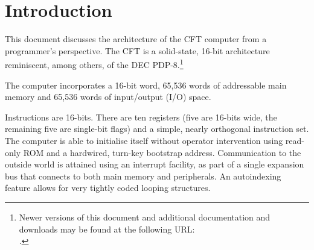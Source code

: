 








\section{Introduction}

  This document discusses the architecture of the CFT computer from a
  programmer's perspective. The CFT is a solid-state, 16-bit
  architecture reminiscent, among others, of the DEC
  PDP-8.\footnote{Newer versions of this document and additional
    documentation and downloads may be found at the following URL:\\
    .}

  The computer incorporates a 16-bit word, 65,536 words of addressable
  main memory and 65,536 words of input/output (I/O) space.

  Instructions are 16-bits. There are ten \glspl{register} (five are 16-bits
  wide, the remaining five are single-bit flags) and a simple, nearly
  orthogonal instruction set. The computer is able to initialise itself without
  operator intervention using read-only ROM and a hardwired, turn-key bootstrap
  address. Communication to the outside world is attained using an interrupt
  facility, as part of a single expansion bus that connects to both main memory
  and peripherals. An autoindexing feature allows for very tightly coded
  looping structures.

